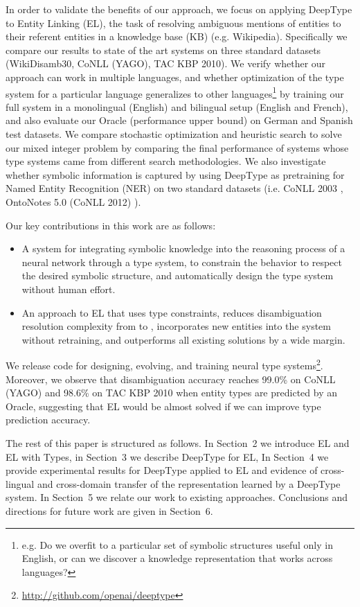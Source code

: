 \documentclass[letterpaper]{article}
\begin{document}
In order to validate the benefits of our approach, we focus on applying DeepType to Entity Linking (EL), the task of resolving ambiguous mentions of entities to their referent entities in a knowledge base (KB) (e.g. Wikipedia).
Specifically we compare our results to state of the art systems on three standard datasets (WikiDisamb30, CoNLL (YAGO), TAC KBP 2010). 
We verify whether our approach can work in multiple languages, and whether optimization of the type system for a particular language generalizes to other languages\footnote{e.g. Do we overfit to a particular set of symbolic structures useful only in English, or can we discover a knowledge representation that works across languages?} by training our full system in a monolingual (English) and bilingual setup (English and French), and also evaluate our Oracle (performance upper bound) on German and Spanish test datasets. We compare stochastic optimization and heuristic search to solve our mixed integer problem by comparing the final performance of systems whose type systems came from different search methodologies. We also investigate whether symbolic information is captured by using DeepType as pretraining for Named Entity Recognition (NER) on two standard datasets (i.e. CoNLL 2003 \cite{Sang2003IntroductionTT}, OntoNotes 5.0 (CoNLL 2012) \cite{Pradhan2012CoNLL2012ST}).

Our key contributions in this work are as follows:
\begin{itemize}
\item  A system for integrating symbolic knowledge into the reasoning process of a neural network through a type system, to constrain the behavior to respect the desired symbolic structure, and automatically design the type system without human effort.
\item An approach to EL that uses type constraints, reduces disambiguation resolution complexity from  to , incorporates new entities into the system without retraining, and outperforms all existing solutions by a wide margin.
\end{itemize}
We release code for designing, evolving, and training neural type systems\footnote{\url{http://github.com/openai/deeptype}}. Moreover, we observe that disambiguation accuracy reaches 99.0\% on CoNLL (YAGO) and 98.6\% on TAC KBP 2010 when entity types are predicted by an Oracle, suggesting that EL would be almost solved if we can improve type prediction accuracy.

The rest of this paper is structured as follows. In Section~2 we introduce EL and EL with Types, in Section~3 we describe DeepType for EL, In Section~4 we provide experimental results for DeepType applied to EL and evidence of cross-lingual and cross-domain transfer of the representation learned by a DeepType system. In Section~5 we relate our work to existing approaches. Conclusions and directions for future work are given in Section~6.
\end{document}
